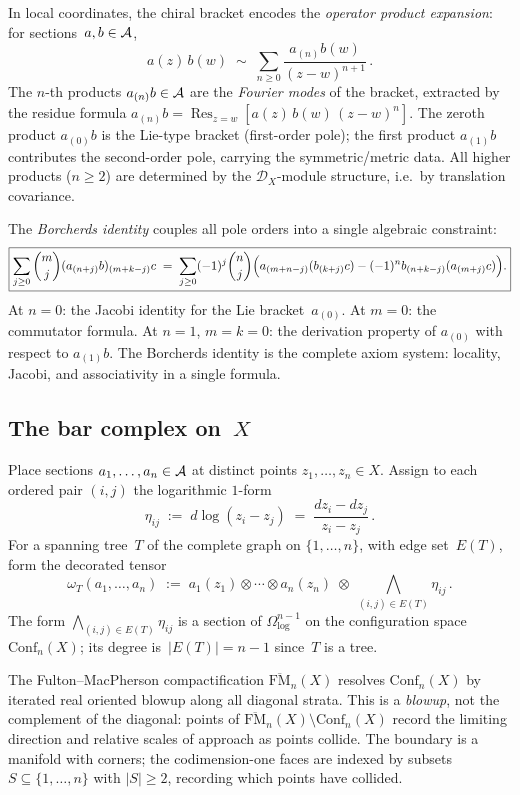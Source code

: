 In local coordinates, the chiral bracket encodes the \emph{operator
product expansion}: for sections~$a,b\in\mathcal{A}$,
\[
a(z)\,b(w)
\;\sim\;
\sum_{n\ge 0}\frac{a_{(n)}b(w)}{(z-w)^{n+1}}\,.
\]
The $n$-th products $a_{(n)}b\in\mathcal{A}$ are the
\emph{Fourier modes} of the bracket, extracted by the
residue formula
$a_{(n)}b = \operatorname{Res}_{z=w}
[a(z)\,b(w)\,(z{-}w)^n]$.
The zeroth product $a_{(0)}b$ is the Lie-type
bracket (first-order pole); the first product $a_{(1)}b$
contributes the second-order pole, carrying the
symmetric/metric data. All higher products ($n\ge 2$)
are determined by the $\mathcal D_X$-module structure,
i.e.\ by translation covariance.

The \emph{Borcherds identity} couples all pole orders into a single
algebraic constraint:
\[
\boxed{
\sum_{j\ge 0}\binom{m}{j}(a_{(n+j)}b)_{(m+k-j)}c
\;=\;
\sum_{j\ge 0}(-1)^j\binom{n}{j}
\Bigl(
a_{(m+n-j)}(b_{(k+j)}c)
-(-1)^n b_{(n+k-j)}(a_{(m+j)}c)
\Bigr).
}
\]
At $n=0$: the Jacobi identity for the Lie bracket~$a_{(0)}$.
At $m=0$: the commutator formula. At $n=1$, $m=k=0$:
the derivation property of $a_{(0)}$ with respect to $a_{(1)}b$.
The Borcherds identity is the complete axiom system: locality,
Jacobi, and associativity in a single formula.


\subsection*{The bar complex on~$X$}

Place sections $a_1,\dots,a_n\in\mathcal{A}$ at distinct points
$z_1,\dots,z_n\in X$. Assign to each ordered pair $(i,j)$ the
logarithmic $1$-form
\[
\eta_{ij}
\;:=\;
d\log(z_i-z_j)
\;=\;
\frac{dz_i-dz_j}{z_i-z_j}\,.
\]
For a spanning tree~$T$ of the complete graph on $\{1,\dots,n\}$, with edge set~$E(T)$,
form the decorated tensor
\[
\omega_T(a_1,\dots,a_n)
\;:=\;
a_1(z_1)\otimes\cdots\otimes a_n(z_n)
\;\otimes\;
\bigwedge_{(i,j)\in E(T)}\eta_{ij}\,.
\]
The form $\bigwedge_{(i,j)\in E(T)}\eta_{ij}$ is a section of
$\Omega^{n-1}_{\log}$ on the configuration space
$\mathrm{Conf}_n(X)$; its degree is~$|E(T)|=n-1$ since~$T$ is a
tree.

The Fulton--MacPherson compactification
$\overline{\mathrm{FM}}_n(X)$ resolves $\mathrm{Conf}_n(X)$ by
iterated real oriented blowup along all diagonal strata. This is a
\emph{blowup}, not the complement of the diagonal: points of
$\overline{\mathrm{FM}}_n(X)\setminus\mathrm{Conf}_n(X)$ record
the limiting direction and relative scales of approach as
points collide. The boundary is a manifold with corners; the
codimension-one faces are indexed by subsets $S\subseteq\{1,\dots,n\}$
with $|S|\ge 2$, recording which points have collided.


